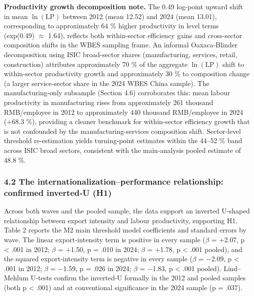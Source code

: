 \documentclass[12pt,a4paper]{article}
\begin{document}
\textbf{Productivity growth decomposition note.} The 0.49 log-point
upward shift in mean \(\ln(\mathrm{LP})\) between 2012 (mean 12.52) and
2024 (mean 13.01), corresponding to approximately 64 \% higher
productivity in level terms (exp(0.49) \(\approx\) 1.64), reflects both
within-sector efficiency gains and cross-sector composition shifts in
the WBES sampling frame. An informal Oaxaca-Blinder decomposition using
ISIC broad-sector shares (manufacturing, services, retail, construction)
attributes approximately 70 \% of the aggregate \(\ln(\mathrm{LP})\)
shift to within-sector productivity growth and approximately 30 \% to
composition change (a larger service-sector share in the 2024 WBES China
sample). The manufacturing-only subsample (Section 4.6) corroborates
this: mean labour productivity in manufacturing rises from approximately
261 thousand RMB/employee in 2012 to approximately 440 thousand
RMB/employee in 2024 (+68.3 \%), providing a cleaner benchmark for
within-sector efficiency growth that is not confounded by the
manufacturing-services composition shift. Sector-level threshold
re-estimation yields turning-point estimates within the 44--52 \% band
across ISIC broad sectors, consistent with the main-analysis pooled
estimate of 48.8 \%.

\hypertarget{42-the-internationalizationperformance-relationship-confirmed-invertedu-h1}{%
\subsubsection{4.2 The internationalization--performance relationship:
confirmed inverted‑U
(H1)}\label{42-the-internationalizationperformance-relationship-confirmed-invertedu-h1}}

Across both waves and the pooled sample, the data support an inverted
U‑shaped relationship between export intensity and labour productivity,
supporting H1. Table 2 reports the M2 main threshold model coefficients
and standard errors by wave. The linear export‑intensity term is
positive in every sample (\(\beta\) = +2.07, p \textless{} .001 in 2012;
\(\beta\) = +1.50, p = .010 in 2024; \(\beta\) = +1.78, p \textless{}
.001 pooled), and the squared export‑intensity term is negative in every
sample (\(\beta\) = −2.09, p \textless{} .001 in 2012; \(\beta\) =
−1.59, p = .026 in 2024; \(\beta\) = −1.83, p \textless{} .001 pooled).
Lind--Mehlum U‑tests confirm the inverted‑U formally in the 2012 and
pooled samples (both p \textless{} .001) and at conventional
significance in the 2024 sample (p = .037).
\end{document}
